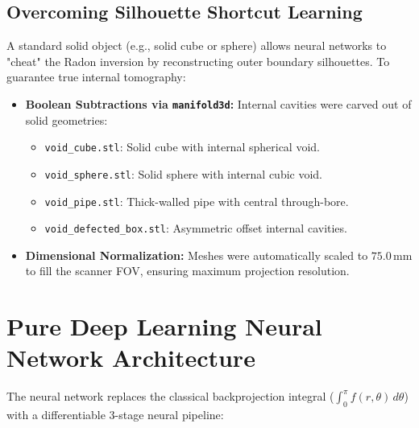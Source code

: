 \documentclass[10pt,a4paper]{article}
\begin{document}
\begin{minipage}[t]{0.48\textwidth}
\subsection{Overcoming Silhouette Shortcut Learning}
A standard solid object (e.g., solid cube or sphere) allows neural networks to "cheat" the Radon inversion by reconstructing outer boundary silhouettes. To guarantee true internal tomography:
\begin{itemize}[leftmargin=*,noitemsep]
    \item \textbf{Boolean Subtractions via \texttt{manifold3d}:} Internal cavities were carved out of solid geometries:
    \begin{itemize}[noitemsep]
        \item \texttt{void\_cube.stl}: Solid cube with internal spherical void.
        \item \texttt{void\_sphere.stl}: Solid sphere with internal cubic void.
        \item \texttt{void\_pipe.stl}: Thick-walled pipe with central through-bore.
        \item \texttt{void\_defected\_box.stl}: Asymmetric offset internal cavities.
    \end{itemize}
    \item \textbf{Dimensional Normalization:} Meshes were automatically scaled to $75.0\,\text{mm}$ to fill the scanner FOV, ensuring maximum projection resolution.
\end{itemize}
\end{minipage}

\vspace{10pt}
\section{Pure Deep Learning Neural Network Architecture}

The neural network replaces the classical backprojection integral ($\int_0^\pi f(r, \theta)\, d\theta$) with a differentiable 3-stage neural pipeline:
\end{document}
